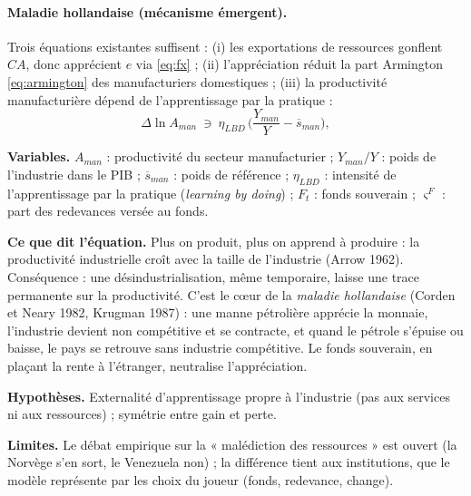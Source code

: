 \documentclass[11pt,a4paper]{article}
\newcommand{\variables}{\par\noindent\textbf{Variables.} }
\newcommand{\sens}{\par\noindent\textbf{Ce que dit l'équation.} }
\newcommand{\hyp}{\par\noindent\textbf{Hypothèses.} }
\newcommand{\limites}{\par\noindent\textbf{Limites.} }
\begin{document}
\paragraph{Maladie hollandaise (mécanisme émergent).} Trois équations existantes suffisent : (i) les exportations de ressources gonflent $CA$, donc apprécient $e$ via \eqref{eq:fx} ; (ii) l'appréciation réduit la part Armington \eqref{eq:armington} des manufacturiers domestiques ; (iii) la productivité manufacturière dépend de l'apprentissage par la pratique :
\begin{equation}
\Delta \ln A_{man} \ \ni\ \eta_{LBD}\,\Big(\frac{Y_{man}}{Y} - \overline{s}_{man}\Big),
\label{eq:lbd}
\end{equation}
\begin{lecture}
\variables $A_{man}$ : productivité du secteur manufacturier ; $Y_{man}/Y$ : poids de l'industrie dans le PIB ; $\overline{s}_{man}$ : poids de référence ; $\eta_{LBD}$ : intensité de l'apprentissage par la pratique (\emph{learning by doing}) ; $F_t$ : fonds souverain ; $\varsigma^F$ : part des redevances versée au fonds.
\sens Plus on produit, plus on apprend à produire : la productivité industrielle croît avec la taille de l'industrie (Arrow 1962). Conséquence : une désindustrialisation, même temporaire, laisse une trace permanente sur la productivité. C'est le cœur de la \emph{maladie hollandaise} (Corden et Neary 1982, Krugman 1987) : une manne pétrolière apprécie la monnaie, l'industrie devient non compétitive et se contracte, et quand le pétrole s'épuise ou baisse, le pays se retrouve sans industrie compétitive. Le fonds souverain, en plaçant la rente à l'étranger, neutralise l'appréciation.
\hyp Externalité d'apprentissage propre à l'industrie (pas aux services ni aux ressources) ; symétrie entre gain et perte.
\limites Le débat empirique sur la « malédiction des ressources » est ouvert (la Norvège s'en sort, le Venezuela non) ; la différence tient aux institutions, que le modèle représente par les choix du joueur (fonds, redevance, change).
\end{lecture}
\end{document}
